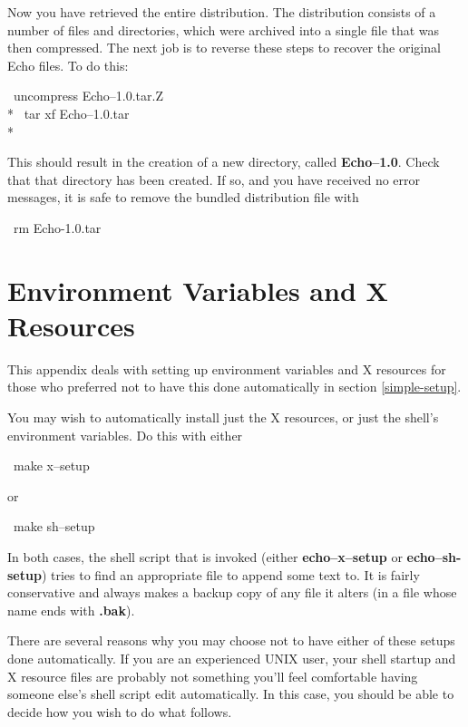 Now you have retrieved the entire distribution. The distribution
consists of a number of files and directories, which were archived
into a single file that was then compressed. The next job is to
reverse these steps to recover the original Echo files.  To do this:

\begin{shell}
\prompt\ uncompress Echo--1.0.tar.Z \\*
\prompt\ tar xf Echo--1.0.tar \\*
\end{shell}

This should result in the creation of a new directory, called {\bf
Echo--1.0}. Check that that directory has been created. If so, and you
have received no error messages, it is safe to remove the bundled
distribution file with

\begin{shell}
\prompt\ rm Echo-1.0.tar
\end{shell}

\newpage
\section{Environment Variables and X Resources}
\label{setting-up}

This appendix deals with setting up environment variables and X
resources for those who preferred not to have this done automatically
in section \ref{simple-setup}.

You may wish to automatically install just the X resources, or just
the shell's environment variables. Do this with either

\begin{shell}
\prompt\ make x--setup
\end{shell}

or

\begin{shell}
\prompt\ make sh--setup
\end{shell}

In both cases, the shell script that is invoked (either {\bf
echo--x--setup} or {\bf echo--sh-setup}) tries to find an appropriate
file to append some text to. It is fairly conservative and always
makes a backup copy of any file it alters (in a file whose name ends
with {\bf .bak}).

There are several reasons why you may choose not to have either of
these setups done automatically. If you are an experienced UNIX user,
your shell startup and X resource files are probably not something
you'll feel comfortable having someone else's shell script edit
automatically. In this case, you should be able to decide how you wish
to do what follows.

